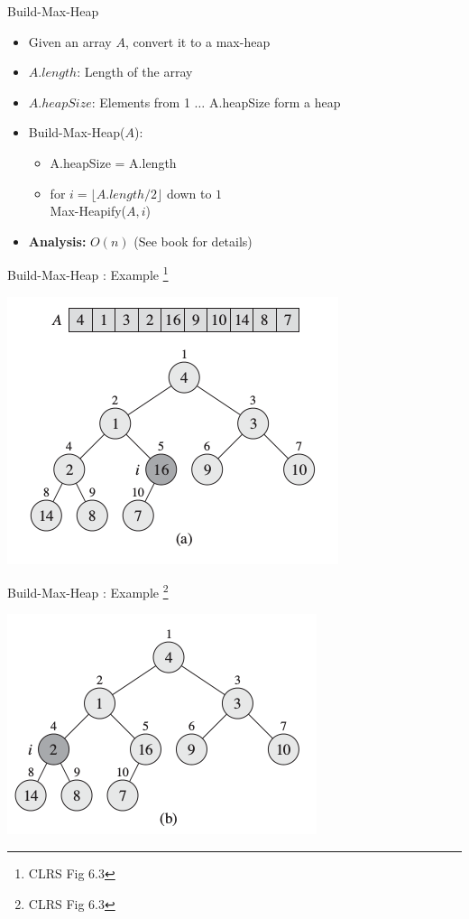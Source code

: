 \documentclass{beamer}
\begin{document}
\begin{frame}{Build-Max-Heap}
    \begin{itemize}
        \item Given an array $A$, convert it to a max-heap
        \item $A.length$: Length of the array
        \item $A.heapSize$: Elements from 1 $\ldots$ A.heapSize form a heap
        \item Build-Max-Heap($A$):
        \begin{itemize}
            \item A.heapSize = A.length
            \item for $i = \lfloor A.length / 2 \rfloor$ down to $1$ \\ \qquad Max-Heapify($A,i$)
        \end{itemize}
        \item {\bf Analysis:} $O(n)$ (See book for details)
    \end{itemize}
\end{frame}


\begin{frame}{Build-Max-Heap : Example \footnote{CLRS Fig 6.3}}
    \begin{center}
        \includegraphics[scale=0.5]{buildMaxHeap1.png}
    \end{center}
\end{frame}


\begin{frame}{Build-Max-Heap : Example \footnote{CLRS Fig 6.3}}
    \begin{center}
        \includegraphics[scale=0.5]{buildMaxHeap2.png}
    \end{center}
\end{frame}
\end{document}
